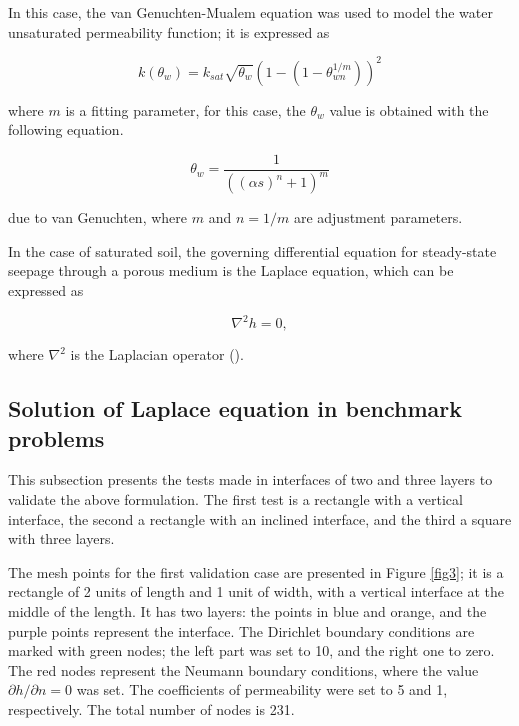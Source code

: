 \documentclass[a4paper,fleqn]{cas-sc}
\begin{document}
In this case, the van Genuchten-Mualem equation was used to model the water unsaturated permeability function; it is expressed as

\begin{equation}
k(\theta_{w})=k_{sat}\sqrt{\theta_{w}}(1-(1-\theta_{wn}^{1/m}))^2
\label{eq16}  
\end{equation}

where $m$ is a fitting parameter, for this case, the $\theta_w$ value is obtained with the following equation.  

\begin{equation}
\theta_{w}=\frac{1}{((\alpha s)^n+1)^m}
\label{eq17}  
\end{equation}


due to van Genuchten, where $m$ and $n=1/m$ are adjustment parameters.


In the case of saturated soil, the governing differential equation for steady-state seepage through a porous medium is the Laplace equation, which can be expressed as

\begin{equation}
  \nabla^2 h=0,
  \label{eq18}  
\end{equation}

where $\nabla^2$ is the Laplacian operator (\cite{desai2013advanced}).

\subsection{Solution of Laplace equation in benchmark problems}

This subsection presents the tests made in interfaces of two and three layers to validate the above formulation. The first test is a rectangle with a vertical interface, the second a rectangle with an inclined interface, and the third a square with three layers. %

The mesh points for the first validation case are presented in Figure \ref{fig3}; it is a rectangle of 2 units of length and 1 unit of width, with a vertical interface at the middle of the length. It has two layers: the points in blue and orange, and the purple points represent the interface. The Dirichlet boundary conditions are marked with green nodes; the left part was set to 10, and the right one to zero. The red nodes represent the Neumann boundary conditions, where the value $\partial h/\partial n=0$ was set. The coefficients of permeability were set to 5 and 1, respectively. The total number of nodes is 231.  
\end{document}
